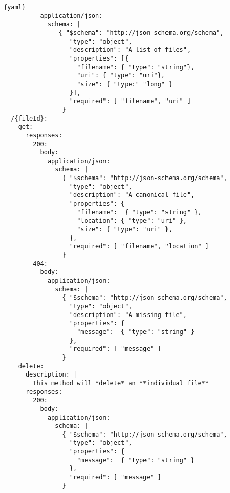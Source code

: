 \begin{lstlisting}{yaml}
          application/json:
            schema: |
               { "$schema": "http://json-schema.org/schema",
                  "type": "object",
                  "description": "A list of files",
                  "properties": [{
                  	"filename": { "type": "string"},
                  	"uri": { "type": "uri"},
                  	"size": { "type:" "long" }
                  }],
                  "required": [ "filename", "uri" ]
                }
  /{fileId}:
    get:
      responses:
        200:
          body:
            application/json:
              schema: |
                { "$schema": "http://json-schema.org/schema",
                  "type": "object",
                  "description": "A canonical file",
                  "properties": {
                    "filename":  { "type": "string" },
                    "location": { "type": "uri" },
                    "size": { "type": "uri" },
                  },
                  "required": [ "filename", "location" ]
                }
        404:
          body:
            application/json:
              schema: |
                { "$schema": "http://json-schema.org/schema",
                  "type": "object",
                  "description": "A missing file",
                  "properties": {
                    "message":  { "type": "string" }
                  },
                  "required": [ "message" ]
                }
    delete:
      description: |
        This method will *delete* an **individual file**
      responses:
        200:
          body:
            application/json:
              schema: |
                { "$schema": "http://json-schema.org/schema",
                  "type": "object",
                  "properties": {
                    "message":  { "type": "string" }
                  },
                  "required": [ "message" ]
                }
\end{lstlisting}